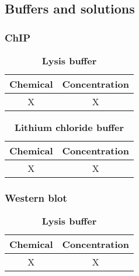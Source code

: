 \documentclass[11pt,twoside,a4paper]{report}
\begin{document}
		\subsection{Buffers and solutions}
			\subsubsection{ChIP}
				\begin{table}[!ht]
       			\caption{
            			\bf{Lysis buffer}
            		}
	        		\begin{center}
    		        		\begin{tabular}{|c|c|}
        		        		\hline
	        		        Chemical & Concentration\\
    		        		    \hline
						X & X\\
		                \hline
		            \end{tabular}
    			    \end{center}
        			\label{tab:label}
			    \end{table}
			    
			    \begin{table}[!ht]
       			\caption{
            			\bf{Lithium chloride buffer}
            		}
	        		\begin{center}
    		        		\begin{tabular}{|c|c|}
        		        		\hline
	        		        Chemical & Concentration\\
    		        		    \hline
						X & X\\
		                \hline
		            \end{tabular}
    			    \end{center}
        			\label{tab:label}
			    \end{table}
			    
			    \subsubsection{Western blot}
				\begin{table}[!ht]
       			\caption{
            			\bf{Lysis buffer}
            		}
	        		\begin{center}
    		        		\begin{tabular}{|c|c|}
        		        		\hline
	        		        Chemical & Concentration\\
    		        		    \hline
						X & X\\
		                \hline
		            \end{tabular}
    			    \end{center}
        			\label{tab:label}
			    \end{table}
		    		    
\end{document}

